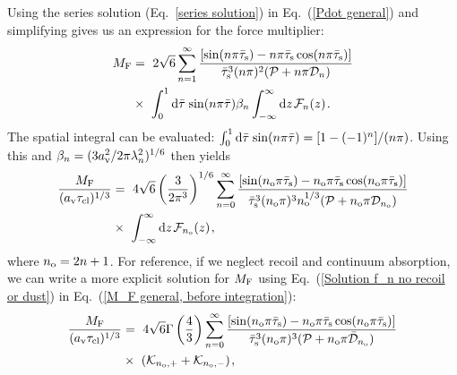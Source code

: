\documentclass[fleqn,usenatbib]{mnras}
\newcommand{\taucl}{\tau_{\rm cl}}
\begin{document}
Using the series solution (Eq.~\ref{series solution}) in Eq.~(\ref{Pdot general}) and simplifying gives us an expression for the force multiplier:
\begin{align}
    M_{\rm F} &=~  2 \sqrt{6} \sum_{n=1}^{\infty}  \dfrac{[\sin(n \pi \Bar{\tau}_{\rm s}) - n\pi \Bar{\tau}_{\rm s}\cos(n \pi \Bar{\tau}_{\rm s})]}{\Bar{\tau}_{\rm s}^3 (n\pi)^2 (\mathcal{P} + n \pi \mathcal{D}_n)} \nonumber \\ &\times~ \int_{0}^{1} \textrm{d}\Bar{\tau} \hspace{1 pt} \sin(n \pi \Bar{\tau}) \beta_n \int_{-\infty}^{\infty} \textrm{d}z \hspace{1 pt} \mathcal{F}_n(z) \hspace{1 pt} \label{M_F general, before integration}.
\end{align}
The spatial integral can be evaluated: $\int_{0}^{1} \textrm{d}\Bar{\tau} \hspace{1 pt} \sin(n\pi\Bar{\tau}) = [1 - (-1)^n]/(n\pi)$. Using this and $\beta_n = (3 a_{\rm v}^2/ 2\pi \lambda_n^2)^{1/6}$ then yields
\begin{align}
    \dfrac{M_{\rm F}}{(a_{\rm v}\taucl)^{1/3}} &=~ 4\sqrt{6} \left( \dfrac{3}{2 \pi^3} \right)^{1/6} \sum_{n = 0}^{\infty} \dfrac{[\sin(n_{\rm o} \pi \Bar{\tau}_{\rm s}) - n_{\rm o}\pi \Bar{\tau}_{\rm s}\cos(n_{\rm o} \pi \Bar{\tau}_{\rm s})]}{\Bar{\tau}_{\rm s}^3 (n_{\rm o}\pi)^3 n_{\rm o}^{1/3} (\mathcal{P} + n_{\rm o} \pi \mathcal{D}_{n_{\rm o}})} \nonumber \\ &\times~ \int_{-\infty}^{\infty} \textrm{d}z \hspace{1 pt} \mathcal{F}_{n_{\rm o}}(z) \hspace{1 pt} \label{M_F general},
\end{align}
where $n_{\rm o} = 2n+1$. For reference, if we neglect recoil and continuum absorption, we can write a more explicit solution for $M_{\rm F}$ using Eq.~(\ref{Solution f_n no recoil or dust}) in Eq.~(\ref{M_F general, before integration}):
\begin{align}
    \dfrac{M_{\rm F}}{(a_{\rm v}\taucl)^{1/3}} &=~ 4\sqrt{6} \Gamma\left( \dfrac{4}{3} \right) \sum_{n = 0}^{\infty} \dfrac{[\sin(n_{\rm o} \pi \Bar{\tau}_{\rm s}) - n_{\rm o}\pi \Bar{\tau}_{\rm s}\cos(n_{\rm o} \pi \Bar{\tau}_{\rm s})]}{\Bar{\tau}_{\rm s}^3 (n_{\rm o}\pi)^3 (\mathcal{P} + n_{\rm o} \pi \Bar{\mathcal{D}}_{n_{\rm o}})} \nonumber \\ &\times~ ( \mathcal{K}_{n_{\rm o},+} + \mathcal{K}_{n_{\rm o},-} ) \hspace{1 pt} \label{M_F velocity gradients exact},
\end{align}
\end{document}
